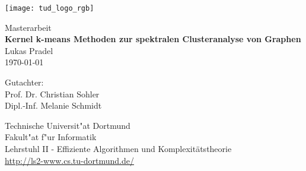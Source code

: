 \begin{titlepage}
\pagestyle{empty}
\vspace*{-2cm}
\newlength{\links}
\setlength{\links}{-1.5cm}
\rmfamily
\hspace*{\links}
\begin{minipage}{12.5cm}
\texttt{[image: tud\_logo\_rgb]}
\end{minipage}

\vspace*{4cm}

\hspace*{\links}
\hspace*{-0.2cm}
\begin{minipage}{9cm}
\large
\begin{center}
{\Large Masterarbeit} \\
\vspace*{1cm}
\textbf{Kernel k-means Methoden zur spektralen Clusteranalyse von Graphen} \\
\vspace*{1cm}
Lukas Pradel\\
\today
\end{center}
\end{minipage}
\normalsize
\vspace*{4.8cm}


\vspace*{2.1cm}

\hspace*{\links}
\begin{minipage}[b]{5cm}
\raggedright
Gutachter: \\
Prof. Dr. Christian Sohler \\
Dipl.-Inf. Melanie Schmidt \\
\end{minipage}

\vspace*{2.5cm}
\hspace*{\links}
\begin{minipage}[b]{11cm}
\raggedright
Technische Universit"at Dortmund \\
Fakult"at f"ur Informatik\\
Lehrstuhl II - Effiziente Algorithmen und Komplexitätstheorie\\
\href{http://ls2-www.cs.tu-dortmund.de/}{http://ls2-www.cs.tu-dortmund.de/}
\end{minipage}
\end{titlepage}
\restoregeometry